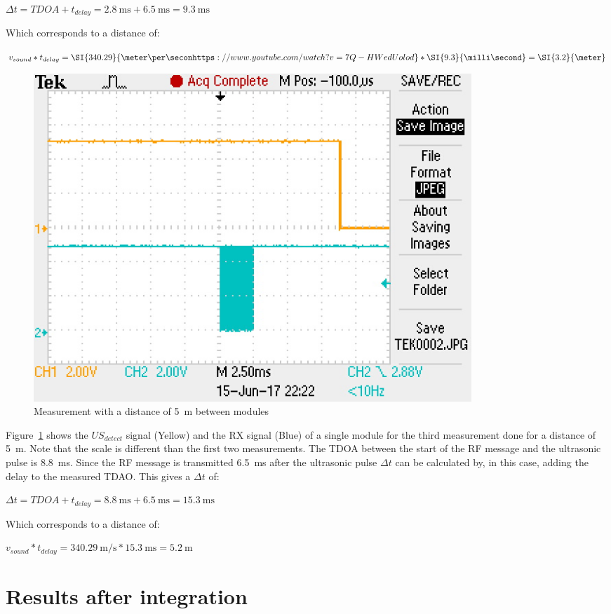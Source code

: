 $ \Delta t = TDOA + t_{delay}  = \SI{2.8}{\milli\second} + \SI{6.5}{\milli\second} = \SI{9.3}{\milli\second} $

Which corresponds to a distance of:

$ v_{sound} * t_{delay} = \SI{340.29}{\meter\per\seconhttps://www.youtube.com/watch?v=7Q-HWedUolod} * \SI{9.3}{\milli\second} = \SI{3.2}{\meter} $

\begin{figure}[H]
\centering
\includegraphics[width=0.8\textwidth]{Figures/test_5m.JPG}
\caption{Measurement with a distance of \SI{5}{\meter} between modules}
\label{fig:mes_5}
\end{figure}

Figure~\ref{fig:mes_5} shows the $US_{detect}$ signal (Yellow) and the RX signal (Blue) of a single module for the third measurement done for a distance of \SI{5}{\meter}.
Note that the scale is different than the first two measurements.
The TDOA between the start of the RF message and the ultrasonic pulse is \SI{8.8}{\milli\second}.
Since the RF message is transmitted \SI{6.5}{\milli\second} after the ultrasonic pulse $\Delta t$ can be calculated by, in this case, adding the delay to the measured TDAO.
This gives a $\Delta t$ of:

$ \Delta t = TDOA + t_{delay}  = \SI{8.8}{\milli\second} + \SI{6.5}{\milli\second} = \SI{15.3}{\milli\second} $

Which corresponds to a distance of:

$ v_{sound} * t_{delay} = \SI{340.29}{\meter\per\second} * \SI{15.3}{\milli\second} = \SI{5.2}{\meter} $

\section{Results after integration}

